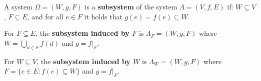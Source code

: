A system $\Omega = (W, g, F)$ is a \textbf{subsystem} of the system $\Lambda = (V, f, E)$ if: $W \subseteq V$, $F \subseteq E$, and for all $e \in F$ it holds that $g(e) = f(e) \subseteq W$.

For $F \subseteq E$, the \textbf{subsystem induced by $F$} is $\Lambda_F = (W, g, F)$ where $W = \bigcup_{d \in F} f(d)$ and $g = f|_F$.

For $W \subseteq V$, the \textbf{subsystem induced by $W$} is $\Lambda_W = (W, g, F)$ where $F = \{e \in E : f(e) \subseteq W\}$ and $g = f|_F$.
